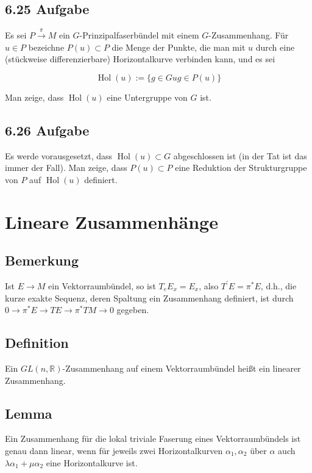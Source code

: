 \documentclass[10pt, letterpaper]{article}
\begin{document}
\subsection*{6.25 Aufgabe}
Es sei $P \xrightarrow{\pi} M$ ein $G$-Prinzipalfaserbündel mit einem $G$-Zusammenhang. Für $u \in P$ bezeichne $P(u) \subset P$ die Menge der Punkte, die man mit $u$ durch eine (stückweise differenzierbare) Horizontalkurve verbinden kann, und es sei

$$
\operatorname{Hol}(u):=\{g \in G u g \in P(u)\}
$$

Man zeige, dass $\operatorname{Hol}(u)$ eine Untergruppe von $G$ ist.

\subsection*{6.26 Aufgabe}
Es werde vorausgesetzt, dass $\operatorname{Hol}(u) \subset G$ abgeschlossen ist (in der Tat ist das immer der Fall). Man zeige, dass $P(u) \subset P$ eine Reduktion der Strukturgruppe von $P$ auf $\operatorname{Hol}(u)$ definiert.





\section*{Lineare Zusammenhänge}
\subsection*{Bemerkung}
Ist $E \rightarrow M$ ein Vektorraumbündel, so ist $T_{e} E_{x}=E_{x}$, also $T^{\prime} E=\pi^{*} E$, d.h., die kurze exakte Sequenz, deren Spaltung ein Zusammenhang definiert, ist durch $0 \rightarrow \pi^{*} E \rightarrow T E \rightarrow \pi^{*} T M \rightarrow 0$ gegeben.

\subsection*{Definition}
Ein $G L(n, \mathbb{R})$-Zusammenhang auf einem Vektorraumbündel heißt ein linearer Zusammenhang.

\subsection*{Lemma}
Ein Zusammenhang für die lokal triviale Faserung eines Vektorraumbündels ist genau dann linear, wenn für jeweils zwei Horizontalkurven $\alpha_{1}, \alpha_{2}$ über $\alpha$ auch $\lambda \alpha_{1}+\mu \alpha_{2}$ eine Horizontalkurve ist.
\end{document}
